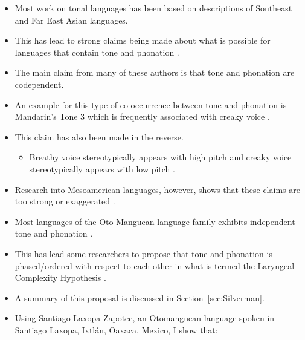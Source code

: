 \documentclass[12pt, letterpaper]{article}
\begin{document}
\begin{itemize}
    \item Most work on tonal languages has been based on descriptions of Southeast and Far East Asian languages.
	\item This has lead to strong claims being made about what is possible for languages that contain tone and phonation \citep{masicaDefiningLinguisticArea1976,thurgoodVietnameseTonogenesisRevising2002,yipTone2002,enfieldArealLinguisticsMainland2005,michaudComplexTonesEast2012,brunelleTonePhonationSoutheast2016}. 
	\item The main claim from many of these authors is that tone and phonation are codependent.
	\item An example for this type of co-occurrence between tone and phonation is Mandarin's Tone 3 which is frequently associated with creaky voice \citep{hockettPeipingPhonology1947,}. 
	\item This claim has also been made in the reverse.
	 \begin{itemize}
		\item Breathy voice stereotypically appears with high pitch and creaky voice stereotypically appears with low pitch \citep{eslingVoiceQualityLaryngeal2019}.
	\end{itemize}
	\item Research into Mesoamerican languages, however, shows that these claims are too strong or exaggerated \citep{suarezMesoamericanIndianLanguages1983,campbellMesoAmericaLinguisticArea1986,silvermanLaryngealComplexityOtomanguean1997,dicanioPhoneticsPhonologySan2008,espositoVariationContrastivePhonation2010, campbellOtomangueanHistoricalLinguistics2017a,campbellOtomangueanHistoricalLinguistics2017}. 
	\item Most languages of the Oto-Manguean language family exhibits independent tone and phonation \citep{silvermanLaryngealComplexityOtomanguean1997,blankenshipTimeCourseBreathiness1997,blankenshipTimingNonmodalPhonation2002,ariza-garciaPhonationTypesTones2018}. 
	\item This has lead some researchers to propose that tone and phonation is phased/ordered with respect to each other in what is termed the Laryngeal Complexity Hypothesis \citep{silvermanLaryngealComplexityOtomanguean1997,blankenshipTimeCourseBreathiness1997,blankenshipTimingNonmodalPhonation2002}. 
	\item A summary of this proposal is discussed in Section~\ref{sec:Silverman}.
	\item Using Santiago Laxopa Zapotec, an Otomanguean language spoken in Santiago Laxopa, Ixtlán, Oaxaca, Mexico, I show that:

\end{itemize}
\end{document}
